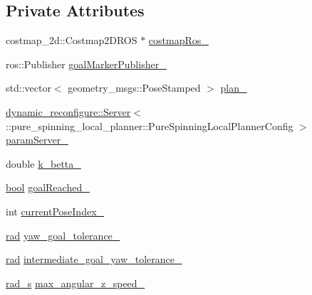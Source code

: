 \subsection*{Private Attributes}
\begin{DoxyCompactItemize}
\item 
costmap\+\_\+2d\+::\+Costmap2\+D\+R\+OS $\ast$ \hyperlink{classcl__move__base__z_1_1pure__spinning__local__planner_1_1PureSpinningLocalPlanner_a63f75481071df118d56e8b652e68b002}{costmap\+Ros\+\_\+}
\item 
ros\+::\+Publisher \hyperlink{classcl__move__base__z_1_1pure__spinning__local__planner_1_1PureSpinningLocalPlanner_a84d46237a0a26822fe5675f0cdddc94d}{goal\+Marker\+Publisher\+\_\+}
\item 
std\+::vector$<$ geometry\+\_\+msgs\+::\+Pose\+Stamped $>$ \hyperlink{classcl__move__base__z_1_1pure__spinning__local__planner_1_1PureSpinningLocalPlanner_a31875ee78bae4698b579e20c0754860d}{plan\+\_\+}
\item 
\hyperlink{sm__ridgeback__floor__coverage__static__1_2servers_2led__action__server_2src_2led__action__server__node_8cpp_a280552a59985eb5d9311dba701679363}{dynamic\+\_\+reconfigure\+::\+Server}$<$\+::pure\+\_\+spinning\+\_\+local\+\_\+planner\+::\+Pure\+Spinning\+Local\+Planner\+Config $>$ \hyperlink{classcl__move__base__z_1_1pure__spinning__local__planner_1_1PureSpinningLocalPlanner_a5e91943cf4500d35199004a09cc09ca4}{param\+Server\+\_\+}
\item 
double \hyperlink{classcl__move__base__z_1_1pure__spinning__local__planner_1_1PureSpinningLocalPlanner_a379d2ba057231d76edd1a661d3572d68}{k\+\_\+betta\+\_\+}
\item 
\hyperlink{classbool}{bool} \hyperlink{classcl__move__base__z_1_1pure__spinning__local__planner_1_1PureSpinningLocalPlanner_aecfe0dfc68b8c8e461e8b684e5fa4d2f}{goal\+Reached\+\_\+}
\item 
int \hyperlink{classcl__move__base__z_1_1pure__spinning__local__planner_1_1PureSpinningLocalPlanner_aa0f9b4cf52a76e44dc2cfc5103d52dcd}{current\+Pose\+Index\+\_\+}
\item 
\hyperlink{backward__local__planner_8h_a640effbe91ae9b25d698a883a9e80d96}{rad} \hyperlink{classcl__move__base__z_1_1pure__spinning__local__planner_1_1PureSpinningLocalPlanner_a07334cd7bf29f391c2553f0038fa94e8}{yaw\+\_\+goal\+\_\+tolerance\+\_\+}
\item 
\hyperlink{backward__local__planner_8h_a640effbe91ae9b25d698a883a9e80d96}{rad} \hyperlink{classcl__move__base__z_1_1pure__spinning__local__planner_1_1PureSpinningLocalPlanner_a2e8dfda5e9dea6f09db4056aa90b2aa8}{intermediate\+\_\+goal\+\_\+yaw\+\_\+tolerance\+\_\+}
\item 
\hyperlink{pure__spinning__local__planner_8h_a76bf9d2bc75b779e3418b2320c652037}{rad\+\_\+s} \hyperlink{classcl__move__base__z_1_1pure__spinning__local__planner_1_1PureSpinningLocalPlanner_a20edb2db356925684de4ee4fe03d5992}{max\+\_\+angular\+\_\+z\+\_\+speed\+\_\+}
\end{DoxyCompactItemize}


